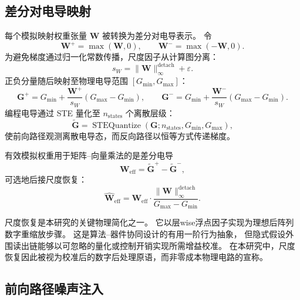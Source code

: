 \subsection{差分对电导映射}

每个模拟映射权重张量 $\mathbf{W}$ 被转换为差分对电导表示。
令
\begin{equation}
\mathbf{W}^{+} = \max(\mathbf{W}, 0), \qquad
\mathbf{W}^{-} = \max(-\mathbf{W}, 0).
\label{eq:weight-split}
\end{equation}
为避免梯度通过归一化常数传播，尺度因子从计算图分离：
\begin{equation}
s_W = \lVert \mathbf{W} \rVert_{\infty}^{\mathrm{detach}} + \varepsilon.
\label{eq:scale-detach}
\end{equation}
正负分量随后映射至物理电导范围 $[G_{\min}, G_{\max}]$：
\begin{equation}
\mathbf{G}^{+} = G_{\min} + \frac{\mathbf{W}^{+}}{s_W}(G_{\max} - G_{\min}), \qquad
\mathbf{G}^{-} = G_{\min} + \frac{\mathbf{W}^{-}}{s_W}(G_{\max} - G_{\min}).
\label{eq:conductance-mapping}
\end{equation}
编程电导通过 STE 量化至 $n_{\text{states}}$ 个离散层级：
\begin{equation}
\widetilde{\mathbf{G}} = \operatorname{STEQuantize}(\mathbf{G}; n_{\text{states}}, G_{\min}, G_{\max}),
\label{eq:ste-quantize}
\end{equation}
使前向路径观测离散电导态，而反向路径以恒等方式传递梯度。

有效模拟权重用于矩阵--向量乘法的是差分电导
\begin{equation}
\mathbf{W}_{\text{eff}} = \widetilde{\mathbf{G}}^{+} - \widetilde{\mathbf{G}}^{-},
\label{eq:eff-weight}
\end{equation}
可选地后接尺度恢复：
\begin{equation}
\widehat{\mathbf{W}}_{\text{eff}} = \mathbf{W}_{\text{eff}} \cdot \frac{\lVert \mathbf{W} \rVert_{\infty}^{\mathrm{detach}}}{G_{\max} - G_{\min}}.
\label{eq:scale-recovery}
\end{equation}

尺度恢复是本研究的关键物理简化之一。
它以层wise浮点因子实现为理想后阵列数字重缩放步骤。
这是算法--器件协同设计的有用一阶行为抽象，
但隐式假设外围读出链能够以可忽略的量化或控制开销实现所需增益校准。
在本研究中，尺度恢复因此被视为校准后的数字后处理原语，而非零成本物理电路的宣称。

\subsection{前向路径噪声注入}

